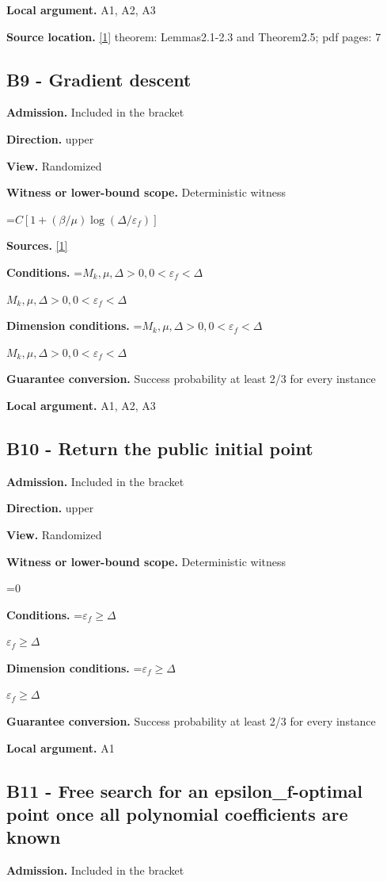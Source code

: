\documentclass[10pt,a4paper]{article}
\newcommand{\AtlasMath}[1]{\par\begingroup\centering\setbox0=\hbox{$\displaystyle #1$}\ifdim\wd0>1.4\linewidth\typeout{ATLAS WIDE FORMULA: \the\wd0}\fi\ifdim\wd0>\linewidth\resizebox{\linewidth}{!}{\box0}\else\box0\fi\par\endgroup}
\newcommand{\AtlasInlineMath}[1]{\begingroup\setbox0=\hbox{$#1$}\ifdim\wd0>.4\linewidth\endgroup\AtlasMath{#1}\else\endgroup$#1$\fi}
\begin{document}
\textbf{Local argument.} A1, A2, A3

\textbf{Source location.} \href{https://optimization-online.org/wp-content/uploads/2015/06/4970.pdf}{[1]} theorem: Lemmas2.1-2.3 and Theorem2.5; pdf pages: 7

\subsection{B9 - Gradient descent}
\textbf{Admission.} Included in the bracket

\textbf{Direction.} upper

\textbf{View.} Randomized

\textbf{Witness or lower-bound scope.} Deterministic witness

\AtlasMath{C[1+(\beta/\mu)\log(\Delta/\varepsilon_f)]}
\textbf{Sources.} \href{https://optimization-online.org/wp-content/uploads/2015/06/4970.pdf}{[1]}

\textbf{Conditions.} \AtlasInlineMath{M_k,\mu,\Delta>0,0<\varepsilon_f<\Delta}

\textbf{Dimension conditions.} \AtlasInlineMath{M_k,\mu,\Delta>0,0<\varepsilon_f<\Delta}

\textbf{Guarantee conversion.} Success probability at least 2/3 for every instance

\textbf{Local argument.} A1, A2, A3

\subsection{B10 - Return the public initial point}
\textbf{Admission.} Included in the bracket

\textbf{Direction.} upper

\textbf{View.} Randomized

\textbf{Witness or lower-bound scope.} Deterministic witness

\AtlasMath{0}
\textbf{Conditions.} \AtlasInlineMath{\varepsilon_f\ge \Delta}

\textbf{Dimension conditions.} \AtlasInlineMath{\varepsilon_f\ge \Delta}

\textbf{Guarantee conversion.} Success probability at least 2/3 for every instance

\textbf{Local argument.} A1

\subsection{B11 - Free search for an epsilon\_f-optimal point once all polynomial coefficients are known}
\textbf{Admission.} Included in the bracket
\end{document}
